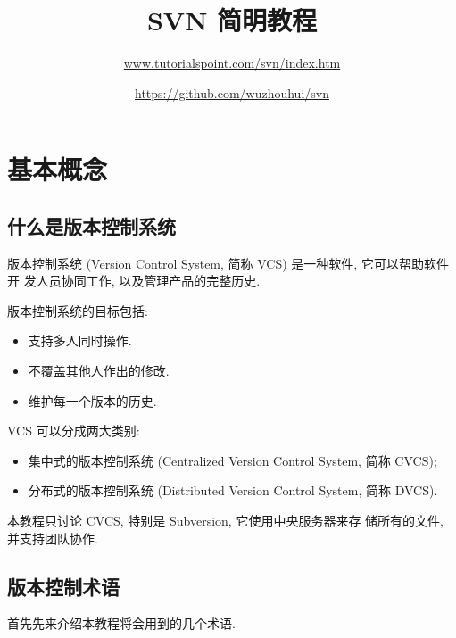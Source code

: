 \documentclass[nofonts, oneside]{ctexart}
\title{SVN 简明教程}
\author{\url{www.tutorialspoint.com/svn/index.htm} \and
	\url{https://github.com/wuzhouhui/svn}}
\begin{document}
\maketitle

\tableofcontents

\section{基本概念}
\label{sec:basic_concepts}

\subsection{什么是版本控制系统}
\label{subsec:what_is_version_control_system}

版本控制系统 (Version Control System, 简称 VCS) 是一种软件, 它可以帮助软件开
发人员协同工作, 以及管理产品的完整历史.

版本控制系统的目标包括:
\begin{itemize}
  \item 支持多人同时操作.
  \item 不覆盖其他人作出的修改.
  \item 维护每一个版本的历史.
\end{itemize}

VCS 可以分成两大类别:
\begin{itemize}
  \item 集中式的版本控制系统 (Centralized Version Control System, 简称 CVCS);
  \item 分布式的版本控制系统 (Distributed Version Control System, 简称 DVCS).
\end{itemize}

本教程只讨论 CVCS, 特别是 Subversion, 它使用中央服务器来存
储所有的文件, 并支持团队协作.

\subsection{版本控制术语}
\label{subsec:version_control_terminologies}

首先先来介绍本教程将会用到的几个术语.
\end{document}
